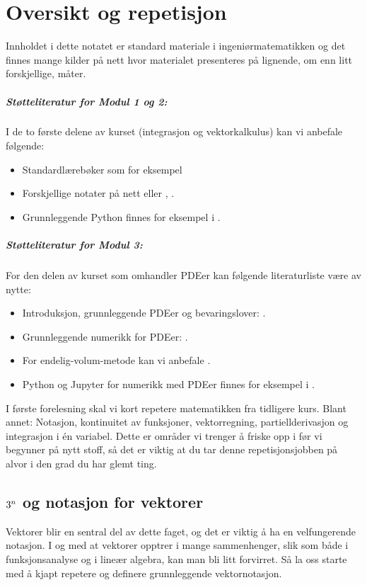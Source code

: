 \chapter*{Oversikt og repetisjon}
\label{chap:Intro}
Innholdet i dette notatet er standard materiale i ingeniørmatematikken og det finnes mange kilder på nett hvor materialet presenteres på lignende, om enn litt forskjellige, måter. 

\paragraph{Støtteliteratur for Modul 1 og 2: }I de to første delene av kurset (integrasjon og vektorkalkulus) kan vi anbefale følgende:
\begin{itemize}
 \item Standardlærebøker som for eksempel \cite{Adams,K93,MaT88,Furlan}
 \item Forskjellige notater på nett \cite{PON} eller \cite[Kapittel 15 og 16]{SaH}, \cite{MLon}.
 \item Grunnleggende Python finnes for eksempel i \cite{Ch23}.
\end{itemize} 
\paragraph{Støtteliteratur for Modul 3: } For den delen av kurset som omhandler PDEer kan følgende literaturliste være av nytte:
\begin{itemize}
\item Introduksjon, grunnleggende PDEer og bevaringslover: \cite{Deb12,Furlan,Ep17,LaT03}.
\item Grunnleggende numerikk for PDEer: \cite{KaM20}.
\item For endelig-volum-metode kan vi anbefale \cite{VaM07}.
\item Python og Jupyter for numerikk med PDEer finnes for eksempel i \cite{cfd12}.
\end{itemize}




\newpage
I første forelesning skal vi kort repetere matematikken fra tidligere kurs. Blant annet: Notasjon, kontinuitet av funksjoner, vektorregning, partiellderivasjon og integrasjon i én variabel. Dette er områder vi trenger å friske opp i før vi begynner på nytt stoff, så det er viktig at du tar denne repetisjonsjobben på alvor i den grad du har glemt ting.

\section{$3^n$ og notasjon for vektorer}
Vektorer blir en sentral del av dette faget, og det er viktig å ha en velfungerende notasjon. I og med at vektorer opptrer i mange sammenhenger, slik som både i funksjonsanalyse og i lineær algebra, kan man bli litt forvirret. Så la oss starte med å kjapt repetere og definere grunnleggende vektornotasjon.

